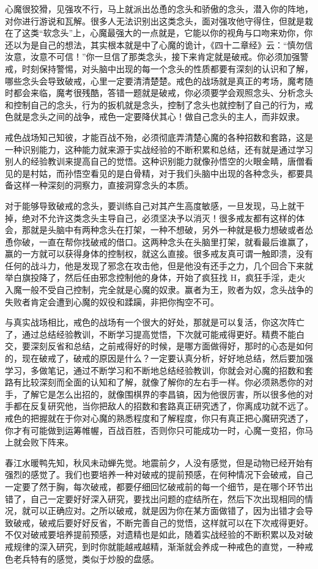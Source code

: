 心魔很狡猾，见强攻不行，马上就派出怂恿的念头和骄傲的念头，潜入你的阵地，对你进行游说和瓦解。很多人无法识别出这类念头，面对强攻他守得住，但就是栽在了这类“软念头”上，心魔最强大的一点就是，它能以你的视角与口吻来劝你，你还以为是自己的想法，其实根本就是中了心魔的诡计，《四十二章经》云：“慎勿信汝意，汝意不可信！”你一旦信了那类念头，接下来肯定就是破戒。你必须加强警戒，时刻保持警惕，对头脑中出现的每一个念头的性质都要有深刻的认识和了解，哪些念头会导致破戒，心里一定要清清楚楚。戒色的战场就是真正的考场，魔考随时都会来临，魔考很残酷，答错一题就是破戒，你必须要学会观照念头、分析念头和控制自己的念头，行为的扳机就是念头，控制了念头也就控制了自己的行为，戒色就是念头之间的战争，戒色一定要降伏其心！做自己念头的主人，而非奴隶。

戒色战场知己知彼，才能百战不殆，必须彻底弄清楚心魔的各种招数和套路，这是一种识别能力，这种能力就来源于实战经验的不断积累和总结，还有就是通过学习别人的经验教训来提高自己的觉悟。这种识别能力就像孙悟空的火眼金睛，唐僧看见的是村姑，而孙悟空看见的是白骨精，对于我们头脑中出现的各种念头，都要具备这样一种深刻的洞察力，直接洞穿念头的本质。

对于能够导致破戒的念头，要训练自己对其产生高度敏感，一旦发现，马上就干掉，绝对不允许这类念头主导自己，必须坚决予以消灭！很多戒友都有这样的体会，那就是头脑中有两种念头在打架，一种不想破，另外一种就是极力想破或者怂恿你破，一直在帮你找破戒的借口。这两种念头在头脑里打架，就看最后谁赢了，赢的一方就可以获得身体的控制权，就这么直接。很多戒友真可谓一触即溃，没有任何的战斗力，他是发现了邪念在攻击他，但是他没有还手之力，几个回合下来就举白旗投降了，然后任由邪念控制他的身体，开始了疯狂找 H，疯狂手淫，走火入魔一般不受自己控制，完全就是心魔的奴隶。赢者为王，败者为奴，念头战争的失败者肯定会遭到心魔的奴役和蹂躏，非把你掏空不可。

与真实战场相比，戒色的战场有一个很大的好处，那就是可以复活，你这次阵亡了，通过总结经验教训，不断学习提高觉悟，下次就可能戒得更好。精费不能白交，要深刻反省和总结，之前戒得好的时候，是哪方面做得好，那时的心态是如何的，现在破戒了，破戒的原因是什么？一定要认真分析，好好地总结，然后要加强学习，多做笔记，通过不断学习和不断地总结经验教训，你就会对心魔的招数和套路有比较深刻而全面的认知和了解，就像了解你的左右手一样。你必须熟悉你的对手，了解它是怎么出招的，就像围棋界的李昌镐，因为他很厉害，所以很多他的对手都在反复研究他，当你把敌人的招数和套路真正研究透了，你离成功就不远了。戒色的把握就在于你对心魔的熟悉程度和了解程度，你只有真正把心魔研究透了，你才有可能做到运筹帷幄，百战百胜，否则你只可能成功一时，心魔一变招，你马上就会败下阵来。

春江水暖鸭先知，秋风未动蝉先觉。地震前夕，人没有感觉，但是动物已经开始有强烈的感觉了。我们也要培养一种对破戒的提前预感，在何种情况下会破戒，自己一定要了然于胸，每次破戒，都要仔细回忆破戒前的每一个细节，是在哪个环节出错了，自己一定要好好深入研究，要找出问题的症结所在，然后下次出现相同的情况，就可以正确应对。之所以破戒，就是因为你在某方面做错了，因为出错才会导致破戒，破戒后要好好反省，不断完善自己的觉悟，这样就可以在下次戒得更好。不仅对破戒要培养提前预感，对遗精也是如此，随着实战经验的不断积累以及对破戒规律的深入研究，到时你就能越戒越精，渐渐就会养成一种戒色的直觉，一种戒色老兵特有的感觉，类似于炒股的盘感。

